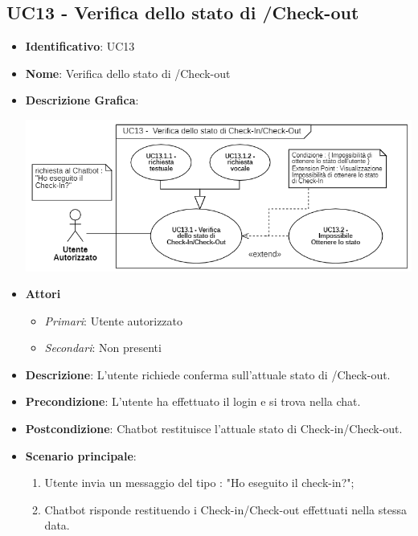 \subsection{UC13 - Verifica dello stato di /Check-out}
\begin{itemize}
	\item \textbf{Identificativo}: UC13
	\item \textbf{Nome}: Verifica dello stato di /Check-out
	\item\textbf{Descrizione Grafica}: 
	\begin{center}
		\includegraphics[scale=0.65]{images/UC13.png} 
	\end{center}

	\item \textbf{Attori}
	\begin{itemize} 
		\item \textit{Primari}: Utente autorizzato
		\item \textit{Secondari}: Non presenti
	\end{itemize}
	\item \textbf{Descrizione}: L'utente richiede conferma sull'attuale stato di /Check-out.
	\item \textbf{Precondizione}: L'utente ha effettuato il login e si trova nella chat.
	\item \textbf{Postcondizione}: Chatbot restituisce l'attuale stato di Check-in/Check-out.
	\item \textbf{Scenario principale}:  \begin{enumerate}
		\item Utente invia un messaggio del tipo : "Ho eseguito il check-in?";
		\item Chatbot risponde restituendo i Check-in/Check-out effettuati nella stessa data.
	\end{enumerate}
\end{itemize}